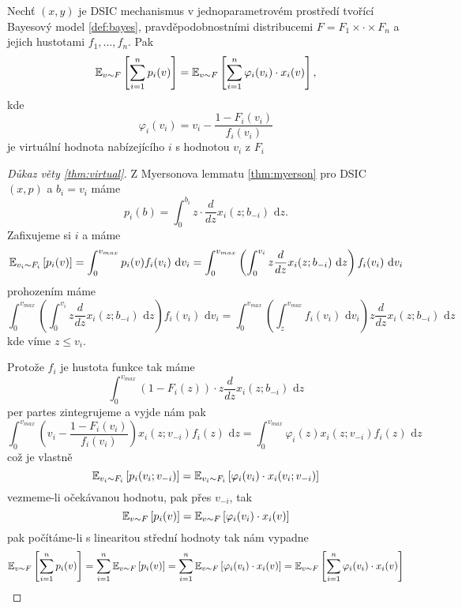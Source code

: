 \begin{theorem}\label{thm:virtual}
    Nechť $(x,y)$ je DSIC mechanismus v jednoparametrovém prostředí tvořící Bayesový model \ref{def:bayes}, pravděpodobnostními distribucemi $F = F_1\times \cdot \times F_n$ a jejich hustotami $f_1, \dots,f_n$. 
    Pak 
    \[
        \E[v\sim F]{\sum^n_{i=1} p_i(v)} = \E[v\sim F]{\sum^n_{i=1} \varphi_i(v_i) \cdot x_i(v)},  
    \]
    kde  
    \[
        \varphi_i(v_i) = v_i - \frac{1-F_i(v_i)}{f_i(v_i)}
    \]
    je virtuální hodnota nabízejícího $i$ s hodnotou $v_i$ z $F_i$
\end{theorem}
\begin{proof}[Důkaz věty \ref{thm:virtual}]
    Z Myersonova lemmatu \ref{thm:myerson} pro DSIC $(x,p)$ a $b_i = v_i$ máme 
    \[
        p_i(b) = \int^{b_i}_0 z \cdot \frac{d}{dz} x_i(z;b_{-i}) \text{ d}z. 
    \]
    Zafixujeme si $i$ a máme 
    \[
        \E[v_i\sim F_i]{p_i(v)} = \int^{v_{max}}_0 p_i(v)f_i(v_i) \text{ d}v_i = \int^{v_{max}}_0 \left( \int_0^{v_i} z \frac{d}{dz} x_i(z;b_{-i}) \text{ d}z \right)f_i(v_i) \text{ d}v_i
    \]
    prohozením máme 
    \[
    \int^{v_{max}}_0 \left( \int_0^{v_i} z \frac{d}{dz} x_i(z;b_{-i}) \text{ d}z \right)f_i(v_i) \text{ d}v_i = \int^{v_{max}}_0 \left( \int_z^{v_{max}} f_i(v_i) \text{ d}v_i \right) z \frac{d}{dz} x_i(z;b_{-i}) \text{ d}z
    \]
    kde víme $z \leq v_i$. 

    Protože $f_i$ je hustota funkce tak máme 
    \[
         \int^{v_{max}}_0 \left( 1- F_i(z) \right) \cdot z \frac{d}{dz} x_i(z;b_{-i}) \text{ d}z
    \]
    per partes zintegrujeme a vyjde nám pak 
    \[
        \int_0^{v_{max}} \left( v_i - \frac{1-F_i(v_i)}{f_i(v_i)} \right) x_i(z;v_{-i})f_i(z) \text{ d}z = \int_0^{v_{max}} \varphi_i(z) x_i(z;v_{-i})f_i(z) \text{ d}z
    \]
    což je vlastně 
    \[
        \E[v_i \sim F_i]{p_i(v_i;v_{-i})} = \E[v_i \sim F_i]{\varphi_i(v_i) \cdot x_i(v_i;v_{-i})}
    \] 
    vezmeme-li očekávanou hodnotu, pak přes $v_{-i}$, tak 
    \[
        \E[v \sim F]{p_i(v)} = \E[v \sim F]{ \varphi_i(v_i) \cdot x_i(v)}
    \]
    pak počítáme-li s linearitou střední hodnoty tak nám vypadne 
    \[
        \E[v \sim F]{\sum^n_{i=1}p_i(v)} = \sum^n_{i=1} \E[v \sim F]{p_i(v)} = \sum^n_{i=1} \E[v \sim F]{\varphi_i(v_i) \cdot x_i(v)} = \E[v \sim F]{\sum^n_{i=1} \varphi_i(v_i) \cdot x_i(v)}
    \]
\end{proof}

